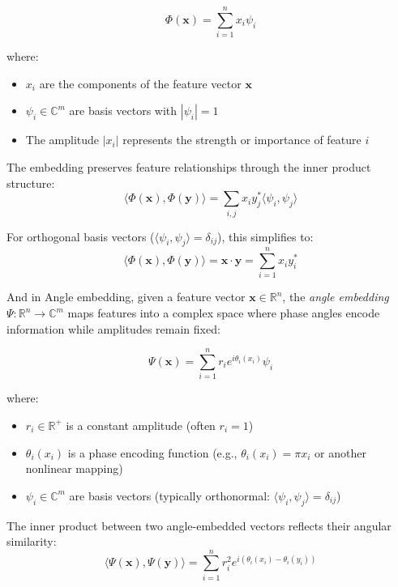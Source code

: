 \documentclass[12pt,a4paper]{article}
\begin{document}
	\begin{equation}
		\Phi(\mathbf{x}) = \sum_{i=1}^{n} x_i \psi_i
	\end{equation}
	
	where:
	\begin{itemize}
		\item $x_i$ are the components of the feature vector $\mathbf{x}$
		\item $\psi_i \in \mathbb{C}^m$ are basis vectors with $|\psi_i| = 1$
		\item The amplitude $|x_i|$ represents the strength or importance of feature $i$
	\end{itemize}
	
	The embedding preserves feature relationships through the inner product structure:
	\begin{equation}
		\langle \Phi(\mathbf{x}), \Phi(\mathbf{y}) \rangle = \sum_{i,j} x_i y_j^* \langle \psi_i, \psi_j \rangle
	\end{equation}
	
	For orthogonal basis vectors ($\langle \psi_i, \psi_j \rangle = \delta_{ij}$), this simplifies to:
	\begin{equation}
		\langle \Phi(\mathbf{x}), \Phi(\mathbf{y}) \rangle = \mathbf{x} \cdot \mathbf{y} = \sum_{i=1}^n x_i y_i^*
	\end{equation}
	
	And in Angle embedding, given a feature vector $\mathbf{x} \in \mathbb{R}^n$, the \textit{angle embedding} $\Psi: \mathbb{R}^n \to \mathbb{C}^m$ maps features into a complex space where phase angles encode information while amplitudes remain fixed:
	
	\begin{equation}
		\Psi(\mathbf{x}) = \sum_{i=1}^{n} r_i e^{i \theta_i(x_i)} \psi_i
	\end{equation}
	
	where:
	\begin{itemize}
		\item $r_i \in \mathbb{R}^+$ is a constant amplitude (often $r_i = 1$)
		\item $\theta_i(x_i)$ is a phase encoding function (e.g., $\theta_i(x_i) = \pi x_i$ or another nonlinear mapping)
		\item $\psi_i \in \mathbb{C}^m$ are basis vectors (typically orthonormal: $\langle \psi_i, \psi_j \rangle = \delta_{ij}$)
	\end{itemize}
	
	The inner product between two angle-embedded vectors reflects their angular similarity:
	\begin{equation}
		\langle \Psi(\mathbf{x}), \Psi(\mathbf{y}) \rangle = \sum_{i=1}^{n} r_i^2 e^{i (\theta_i(x_i) - \theta_i(y_i))}
	\end{equation}
	
\end{document}
